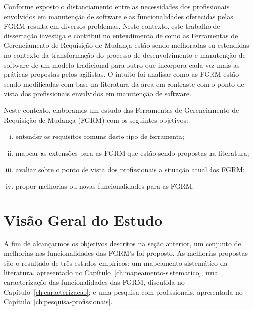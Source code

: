 Conforme exposto o distanciamento entre as necessidades dos profissionais
envolvidos em manutenção de software e as funcionalidades oferecidas pelas FGRM
resulta em diversos problemas. Neste contexto, este trabalho de dissertação
investiga e contribui no entendimento de como as Ferramentas de Gerenciamento de
Requisição de Mudança estão sendo melhoradas ou estendidas no contexto da
transformação do processo de desenvolvimento e manutenção de software de um
modelo tradicional para outro que incorpora cada vez mais as práticas propostas
pelos agilistas. O intuito foi analisar como as FGRM estão sendo modificadas com
base na literatura da área em contraste com o ponto de vista dos profissionais
envolvidos em manutenção de software.

Neste contexto, elaboramos um estudo das Ferramentas de Gerenciamento de
Requisição de Mudança (FGRM) com os seguintes objetivos:
\begin{enumerate}[(i)]
	\item entender os requisitos comuns deste tipo de ferramenta;
	\item mapear as extensões para as FGRM que estão sendo propostas na
		literatura;
	\item avaliar sobre o ponto de vista dos profissionais a
		situação atual dos FGRM\@;
	\item propor melhorias ou novas funcionalidades para as FGRM\@. 
\end{enumerate}


\section{Visão Geral do Estudo}
\label{sec:intro-visao-geral}


A fim de alcançarmos os objetivos descritos na seção anterior, um conjunto de
melhorias nas funcionalidades das FGRM's foi proposto. As melhorias propostas
são o resultado de três estudos empíricos: um mapeamento sistemático da
literatura, apresentado no Capítulo~\ref{ch:mapeamento-sistematico}, uma
caracterização das funcionalidades das FGRM, discutida no
Capítulo~\ref{ch:caracterizacao}; e uma pesquisa com profissionais, apresentada
no Capítulo~\ref{ch:pesquisa-profissionais}.

